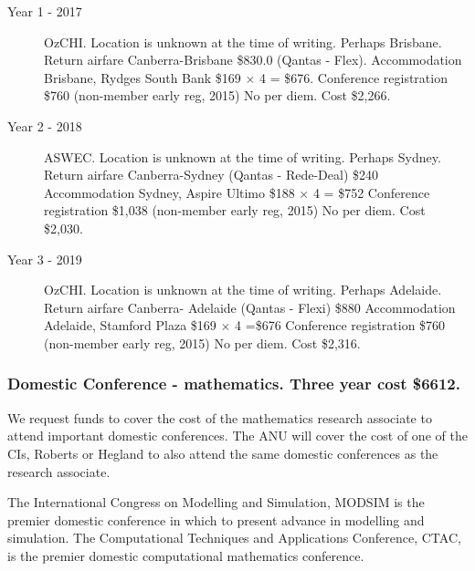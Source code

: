 \documentclass[a4paper,fontsize=12pt]{scrartcl}
\begin{document}
\begin{description}
\item[Year 1 - 2017] OzCHI. 
Location is unknown at the time of writing. Perhaps Brisbane. 
Return airfare Canberra-Brisbane \$830.0 (Qantas - Flex). Accommodation Brisbane, 
Rydges South Bank \$169 $\times$  4 = \$676. 
Conference registration \$760 (non-member early reg, 2015) No per diem. Cost \$2,266. 

\item[Year 2 - 2018] ASWEC.
Location is unknown at the time of writing. Perhaps Sydney.
Return airfare Canberra-Sydney (Qantas - Rede-Deal) \$240
Accommodation Sydney, Aspire Ultimo \$188 $\times$ 4 = \$752
Conference registration \$1,038 (non-member early reg, 2015) 
No per diem. Cost \$2,030.



\item[Year 3 -  2019] OzCHI.
Location is unknown at the time of writing. Perhaps Adelaide.
Return airfare Canberra- Adelaide (Qantas - Flexi) \$880
Accommodation Adelaide, Stamford Plaza \$169 $\times$ 4 =\$676
Conference registration \$760 (non-member early reg, 2015)
No per diem. Cost \$2,316.


\end{description}



\subsubsection*{Domestic Conference - mathematics. Three year cost \$6612.}

We request funds to cover the cost of the mathematics research associate to attend important domestic conferences.  The ANU will cover the cost of one of the CIs, Roberts or Hegland to also attend the same domestic conferences as the research associate. 

The International Congress on Modelling and Simulation, MODSIM is the premier domestic conference in which to present advance in modelling and simulation. 
The Computational Techniques and Applications Conference, CTAC, is the premier domestic computational mathematics conference.
\end{document}
